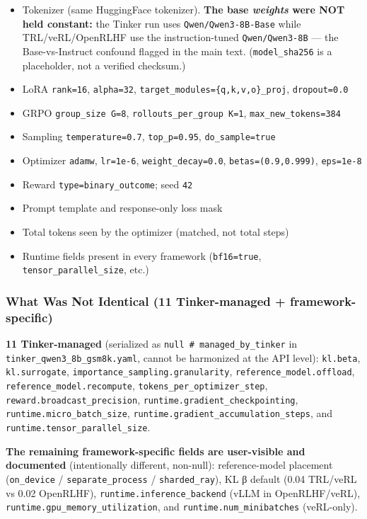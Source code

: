 \documentclass[
  american,
  11pt,
  a4paper,
  oneside]{report}
\providecommand{\tightlist}{%
  \setlength{\itemsep}{0pt}\setlength{\parskip}{0pt}}
\begin{document}
\begin{itemize}
\tightlist
\item
  Tokenizer (same HuggingFace tokenizer). \textbf{The base \emph{weights}
  were NOT held constant:} the Tinker run uses \texttt{Qwen/Qwen3-8B-Base}
  while TRL/veRL/OpenRLHF use the instruction-tuned \texttt{Qwen/Qwen3-8B}
  --- the Base-vs-Instruct confound flagged in the main text.
  (\texttt{model\_sha256} is a placeholder, not a verified checksum.)
\item
  LoRA \texttt{rank=16}, \texttt{alpha=32},
  \texttt{target\_modules=\{q,k,v,o\}\_proj}, \texttt{dropout=0.0}
\item
  GRPO \texttt{group\_size\ G=8}, \texttt{rollouts\_per\_group\ K=1},
  \texttt{max\_new\_tokens=384}
\item
  Sampling \texttt{temperature=0.7}, \texttt{top\_p=0.95},
  \texttt{do\_sample=true}
\item
  Optimizer \texttt{adamw}, \texttt{lr=1e-6},
  \texttt{weight\_decay=0.0}, \texttt{betas=(0.9,0.999)},
  \texttt{eps=1e-8}
\item
  Reward \texttt{type=binary\_outcome}; seed \texttt{42}
\item
  Prompt template and response-only loss mask
\item
  Total tokens seen by the optimizer (matched, not total steps)
\item
  Runtime fields present in every framework (\texttt{bf16=true},
  \texttt{tensor\_parallel\_size}, etc.)
\end{itemize}

\subsubsection{What Was Not Identical (11 Tinker-managed +
framework-specific)}\label{what-was-framework-managed-11-documented-5-tinker-managed}

\textbf{11 Tinker-managed} (serialized as
\texttt{null\ \#\ managed\_by\_tinker} in
\texttt{tinker\_qwen3\_8b\_gsm8k.yaml}, cannot be harmonized at the API
level): \texttt{kl.beta}, \texttt{kl.surrogate},
\texttt{importance\_sampling.granularity}, \texttt{reference\_model.offload},
\texttt{reference\_model.recompute}, \texttt{tokens\_per\_optimizer\_step},
\texttt{reward.broadcast\_precision}, \texttt{runtime.gradient\_checkpointing},
\texttt{runtime.micro\_batch\_size},
\texttt{runtime.gradient\_accumulation\_steps}, and
\texttt{runtime.tensor\_parallel\_size}.

\textbf{The remaining framework-specific fields are user-visible and documented}
(intentionally different, non-null): reference-model placement
(\texttt{on\_device} / \texttt{separate\_process} / \texttt{sharded\_ray}),
KL β default (0.04 TRL/veRL vs 0.02 OpenRLHF),
\texttt{runtime.inference\_backend} (vLLM in OpenRLHF/veRL),
\texttt{runtime.gpu\_memory\_utilization}, and
\texttt{runtime.num\_minibatches} (veRL-only).
\end{document}
